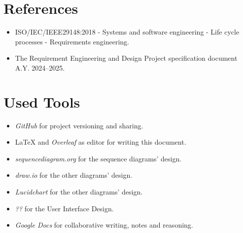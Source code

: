 \section{References}
\label{sec:references}%

\begin{itemize}
    \item ISO/IEC/IEEE29148:2018 - Systems and software engineering - Life cycle processes - Requirements engineering.
    \item The Requirement Engineering and Design Project specification document A.Y. 2024–2025. 
\end{itemize}

\section{Used Tools}
\label{sec:used_tools}%
\begin{itemize}
    \item \textit{GitHub} for project versioning and sharing.
    \item \LaTeX{} and \textit{Overleaf} as editor for writing this document.
    \item \textit{sequencediagram.org} for the sequence diagrams' design.
    \item \textit{draw.io} for the other diagrams' design.
    \item \textit{Lucidchart} for the other diagrams' design.
    \item \textit{??} for the User Interface Design.
    \item \textit{Google Docs} for collaborative writing, notes and reasoning.
\end{itemize}
